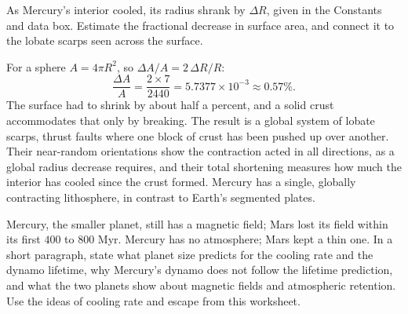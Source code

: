 \parti As Mercury's interior cooled, its radius shrank by $\Delta R$, given in the Constants and data box.
Estimate the fractional decrease in surface area,
and connect it to the lobate scarps seen across the surface.

\begin{solution}
For a sphere $A = 4\pi R^2$, so $\Delta A/A = 2\,\Delta R/R$:
\[
\frac{\Delta A}{A} = \frac{2 \times 7}{2440} = 5.7377\times10^{-3} \approx 0.57\%.
\]
The surface had to shrink by about half a percent, and a solid crust accommodates that only by breaking.
The result is a global system of lobate scarps, thrust faults where one block of crust has been pushed up over another.
Their near-random orientations show the contraction acted in all directions, as a global radius decrease requires,
and their total shortening measures how much the interior has cooled since the crust formed.
Mercury has a single, globally contracting lithosphere, in contrast to Earth's segmented plates.
\end{solution}

\parti Mercury, the smaller planet, still has a magnetic field; Mars lost its field within its first $400$ to $800$ Myr.
Mercury has no atmosphere; Mars kept a thin one.
In a short paragraph, state what planet size predicts for the cooling rate and the dynamo lifetime,
why Mercury's dynamo does not follow the lifetime prediction,
and what the two planets show about magnetic fields and atmospheric retention.
Use the ideas of cooling rate and escape from this worksheet.

